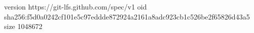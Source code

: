 version https://git-lfs.github.com/spec/v1
oid sha256:f5d0a0242cf101e5c97eddde872924a2161a8adc923cb1c526be2f65826d43a5
size 1048672
